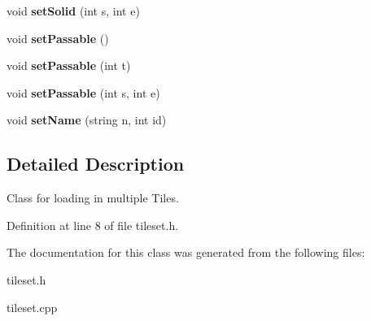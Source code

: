 \begin{DoxyCompactItemize}
\item 
void {\bfseries set\+Solid} (int s, int e)\hypertarget{classTileset_a6d40a14146a3dedd0217a412a66f4c9a}{}\label{classTileset_a6d40a14146a3dedd0217a412a66f4c9a}

\item 
void {\bfseries set\+Passable} ()\hypertarget{classTileset_a9fc3756317f238121769629ea20a9849}{}\label{classTileset_a9fc3756317f238121769629ea20a9849}

\item 
void {\bfseries set\+Passable} (int t)\hypertarget{classTileset_a231401092d65e28b7dea12e97e3232ad}{}\label{classTileset_a231401092d65e28b7dea12e97e3232ad}

\item 
void {\bfseries set\+Passable} (int s, int e)\hypertarget{classTileset_a84b12096b06c7162ca4bb9058a232d21}{}\label{classTileset_a84b12096b06c7162ca4bb9058a232d21}

\item 
void {\bfseries set\+Name} (string n, int id)\hypertarget{classTileset_ad5f3a60a84cec25c6e11856a7cd36d84}{}\label{classTileset_ad5f3a60a84cec25c6e11856a7cd36d84}

\end{DoxyCompactItemize}


\subsection{Detailed Description}
Class for loading in multiple Tiles. 

Definition at line 8 of file tileset.\+h.



The documentation for this class was generated from the following files\+:\begin{DoxyCompactItemize}
\item 
tileset.\+h\item 
tileset.\+cpp\end{DoxyCompactItemize}
